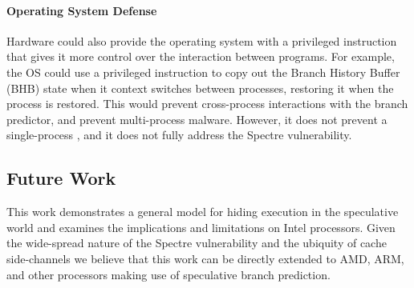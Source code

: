 \paragraph{Operating System Defense}
Hardware could also provide the operating system with a privileged instruction
that gives it more control over the interaction between programs. For example,
the OS could use a privileged instruction to copy out the Branch History Buffer
(BHB) state when it context switches between processes, restoring it when the
process is restored. This would prevent cross-process interactions with the
branch predictor, and prevent multi-process \speculake malware. However, it does
not prevent a single-process \speculake, and it does not fully address the
Spectre vulnerability.


%
%
%


\subsection{Future Work}
\label{subsec:future-work}

This work demonstrates a general model for hiding execution in 
the speculative world and examines the implications and limitations on 
Intel processors. Given the wide-spread nature of the Spectre vulnerability 
and the ubiquity of cache side-channels we believe that this work can 
be directly extended to AMD, ARM, and other processors making use of
speculative branch prediction.

